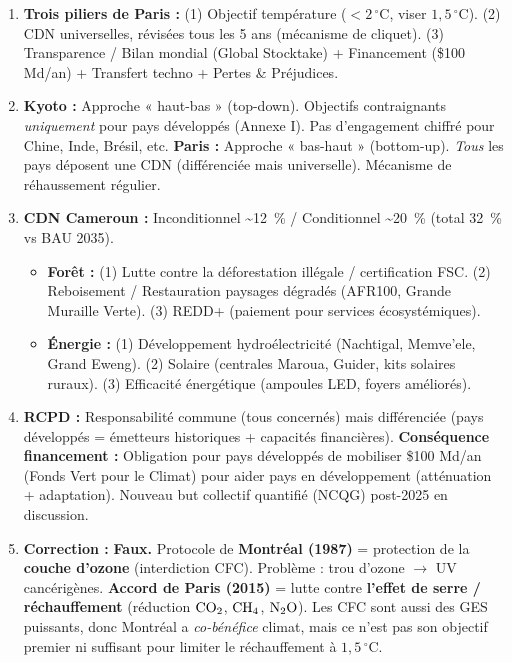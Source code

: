 \documentclass[11pt]{article}
\begin{document}
\begin{corrige}
\begin{enumerate}
    \item \textbf{Trois piliers de Paris :} (1) Objectif température ($<2\,^\circ\mathrm{C}$, viser $1,5\,^\circ\mathrm{C}$). (2) CDN universelles, révisées tous les 5 ans (mécanisme de cliquet). (3) Transparence / Bilan mondial (Global Stocktake) + Financement (\$100 Md/an) + Transfert techno + Pertes \& Préjudices.
    \item \textbf{Kyoto :} Approche « haut-bas » (top-down). Objectifs contraignants \emph{uniquement} pour pays développés (Annexe I). Pas d'engagement chiffré pour Chine, Inde, Brésil, etc. \textbf{Paris :} Approche « bas-haut » (bottom-up). \emph{Tous} les pays déposent une CDN (différenciée mais universelle). Mécanisme de réhaussement régulier.
    \item \textbf{CDN Cameroun :} Inconditionnel \textasciitilde \SI{12}{\%} / Conditionnel \textasciitilde \SI{20}{\%} (total \SI{32}{\%} vs BAU 2035).
    \begin{itemize}
        \item \textbf{Forêt :} (1) Lutte contre la déforestation illégale / certification FSC. (2) Reboisement / Restauration paysages dégradés (AFR100, Grande Muraille Verte). (3) REDD+ (paiement pour services écosystémiques).
        \item \textbf{Énergie :} (1) Développement hydroélectricité (Nachtigal, Memve'ele, Grand Eweng). (2) Solaire (centrales Maroua, Guider, kits solaires ruraux). (3) Efficacité énergétique (ampoules LED, foyers améliorés).
    \end{itemize}
    \item \textbf{RCPD :} Responsabilité commune (tous concernés) mais différenciée (pays développés = émetteurs historiques + capacités financières). \textbf{Conséquence financement :} Obligation pour pays développés de mobiliser \$100 Md/an (Fonds Vert pour le Climat) pour aider pays en développement (atténuation + adaptation). Nouveau but collectif quantifié (NCQG) post-2025 en discussion.
    \item \textbf{Correction :} \textbf{Faux.} Protocole de \textbf{Montréal (1987)} = protection de la \textbf{couche d'ozone} (interdiction CFC). Problème : trou d'ozone $\rightarrow$ UV cancérigènes. \textbf{Accord de Paris (2015)} = lutte contre \textbf{l'effet de serre / réchauffement} (réduction $\ce{CO2}$, $\ce{CH4}$, $\ce{N2O}$). Les CFC sont aussi des GES puissants, donc Montréal a \emph{co-bénéfice} climat, mais ce n'est pas son objectif premier ni suffisant pour limiter le réchauffement à $1,5\,^\circ\mathrm{C}$.
\end{enumerate}
\end{corrige}
\end{document}
